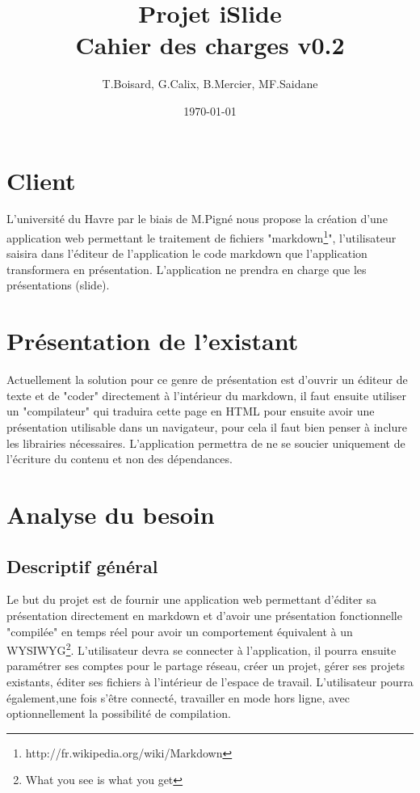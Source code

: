 \documentclass[11pt,a4paper]{article}
\begin{document}
\author{T.Boisard, G.Calix, B.Mercier, MF.Saidane}
\date{\today}
\title{Projet iSlide\\Cahier des charges v0.2}




\tableofcontents
\newpage

\section{Client}
L'université du Havre par le biais de M.Pigné nous propose la création d'une application web permettant le traitement de fichiers "markdown\footnote{http://fr.wikipedia.org/wiki/Markdown}", l'utilisateur saisira dans l'éditeur de l'application le code markdown que l'application transformera en présentation. L'application ne prendra en charge que les présentations (slide).


\section{Présentation de l'existant}

Actuellement la solution pour ce genre de présentation est d'ouvrir un éditeur de texte et de "coder" directement à l'intérieur du markdown, il faut ensuite utiliser un "compilateur" qui traduira cette page en HTML pour ensuite avoir une présentation utilisable dans un navigateur, pour cela il faut bien penser à inclure les librairies nécessaires. L'application permettra de ne se soucier uniquement de l'écriture du contenu et non des dépendances.

\section{Analyse du besoin}

\subsection{Descriptif général}
Le but du projet est de fournir une application web permettant d'éditer sa présentation directement en markdown et d'avoir une présentation fonctionnelle "compilée" en temps réel pour avoir un comportement équivalent à un WYSIWYG\footnote{What you see is what you get}. L'utilisateur devra se connecter à l'application, il pourra ensuite paramétrer ses comptes pour le partage réseau, créer un projet, gérer ses projets existants, éditer ses fichiers à l'intérieur de l'espace de travail.
L'utilisateur pourra également,une fois s'être connecté, travailler en mode hors ligne, avec optionnellement la possibilité de compilation.
\end{document}
